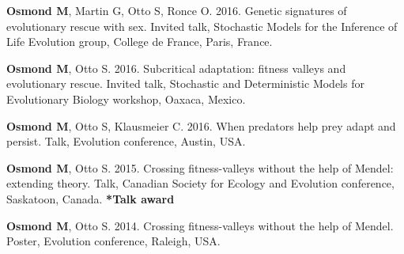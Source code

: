 \documentclass[12pt]{article}
\begin{document}
\textbf{Osmond M}, Martin G, Otto S, Ronce O. 2016. Genetic signatures of evolutionary rescue with sex. Invited talk, Stochastic Models for the Inference of Life Evolution group, College de France, Paris, France. 


\textbf{Osmond M}, Otto S. 2016. Subcritical adaptation: fitness valleys and evolutionary rescue. Invited talk, Stochastic and Deterministic Models for Evolutionary Biology workshop, Oaxaca, Mexico. 


\textbf{Osmond M}, Otto S, Klausmeier C. 2016. When predators help prey adapt and persist. Talk, Evolution conference, Austin, USA. 


\textbf{Osmond M}, Otto S. 2015. Crossing fitness-valleys without the help of Mendel: extending theory. Talk, Canadian Society for Ecology and Evolution conference, Saskatoon, Canada. \textbf{*Talk award}


\textbf{Osmond M}, Otto S. 2014. Crossing fitness-valleys without the help of Mendel. Poster, Evolution conference, Raleigh, USA.




\end{document}
